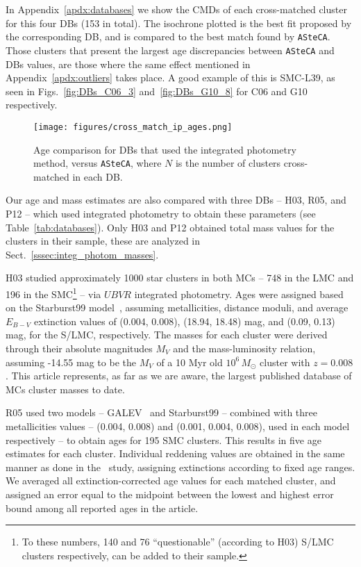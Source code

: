 \documentclass{aa}
\begin{document}
In Appendix~\ref{apdx:databases} we show the CMDs of each cross-matched cluster
for this four DBs (153 in total). The isochrone plotted is the best fit proposed
by the corresponding DB, and is compared to the best match found by
\texttt{ASteCA}.
Those clusters that present the largest age discrepancies between
\texttt{ASteCA} and DBs values, are those where the same effect mentioned in
Appendix~\ref{apdx:outliers} takes place. A good example of this is SMC-L39, as
seen in Figs.~\ref{fig:DBs_C06_3} and~\ref{fig:DBs_G10_8} for C06 and G10
respectively.\\


%

\begin{figure}
\centering
\texttt{[image: figures/cross\_match\_ip\_ages.png]}
\caption{Age comparison for DBs that used the integrated photometry
method, versus \texttt{ASteCA}, where $N$ is the number of clusters cross-matched in
each DB.\@}
\label{fig:cross_match_ip_age}
\end{figure}

Our age and mass estimates are also compared with three DBs -- H03, R05, and P12
-- which used integrated photometry to obtain these parameters (see
Table~\ref{tab:databases}). Only H03 and P12 obtained total mass values for the
clusters in their sample, these are analyzed in
Sect.~\ref{sssec:integ_photom_masses}.

H03 studied approximately 1000 star clusters in both MCs -- 748 in the LMC and
196 in the SMC\footnote{To these numbers, 140 and 76 ``questionable'' (according
to H03) S/LMC clusters respectively, can be added to their sample.} --
via $UBVR$ integrated photometry. Ages were assigned based on the Starburst99
model~\citep{Leitherer_1999}, assuming metallicities, distance moduli, and
average $E_{B-V}$ extinction values of (0.004, 0.008), (18.94, 18.48) mag, and 
(0.09, 0.13) mag, for the S/LMC, respectively.
The masses for each cluster were derived through their absolute
magnitudes $M_V$ and the mass-luminosity relation, assuming -14.55 mag to be the
$M_V$ of a 10 Myr old $10^6\,M_{\odot}$ cluster with $z=0.008$.
This article represents, as far as we are aware, the largest
published database of MCs cluster masses to date.

R05 used two models -- GALEV~\citep{Anders_2003} and Starburst99 -- combined
with three metallicities values -- (0.004, 0.008) and (0.001, 0.004, 0.008),
used in each model respectively -- to obtain ages for 195 SMC clusters.
This results in five age estimates for each cluster. Individual reddening
values are obtained in the same manner as done in the~\cite{Harris_2004} study,
assigning extinctions according to fixed age ranges.
%
We averaged all extinction-corrected age values for each matched cluster,
and assigned an error equal to the midpoint between the lowest and
highest error bound among all reported ages in the article.
\end{document}

